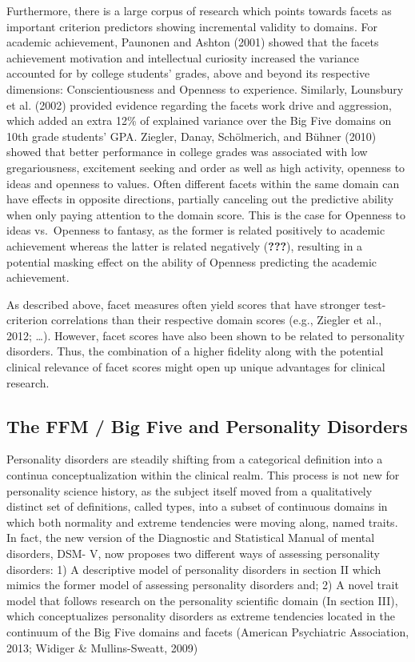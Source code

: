 \documentclass[man]{apa6}
\theoremstyle{definition}
\theoremstyle{definition}
\theoremstyle{definition}
\theoremstyle{remark}
\begin{document}
Furthermore, there is a large corpus of research which points towards
facets as important criterion predictors showing incremental validity to
domains. For academic achievement, Paunonen and Ashton (2001) showed
that the facets achievement motivation and intellectual curiosity
increased the variance accounted for by college students' grades, above
and beyond its respective dimensions: Conscientiousness and Openness to
experience. Similarly, Lounsbury et al. (2002) provided evidence
regarding the facets work drive and aggression, which added an extra
12\% of explained variance over the Big Five domains on 10th grade
students' GPA. Ziegler, Danay, Schölmerich, and Bühner (2010) showed
that better performance in college grades was associated with low
gregariousness, excitement seeking and order as well as high activity,
openness to ideas and openness to values. Often different facets within
the same domain can have effects in opposite directions, partially
canceling out the predictive ability when only paying attention to the
domain score. This is the case for Openness to ideas vs.~Openness to
fantasy, as the former is related positively to academic achievement
whereas the latter is related negatively ({\textbf{???}}), resulting in
a potential masking effect on the ability of Openness predicting the
academic achievement.

As described above, facet measures often yield scores that have stronger
test-criterion correlations than their respective domain scores (e.g.,
Ziegler et al., 2012; \ldots{}). However, facet scores have also been
shown to be related to personality disorders. Thus, the combination of a
higher fidelity along with the potential clinical relevance of facet
scores might open up unique advantages for clinical research.

\hypertarget{the-ffm-big-five-and-personality-disorders}{%
\subsection{The FFM / Big Five and Personality
Disorders}\label{the-ffm-big-five-and-personality-disorders}}

Personality disorders are steadily shifting from a categorical
definition into a continua conceptualization within the clinical realm.
This process is not new for personality science history, as the subject
itself moved from a qualitatively distinct set of definitions, called
types, into a subset of continuous domains in which both normality and
extreme tendencies were moving along, named traits. In fact, the new
version of the Diagnostic and Statistical Manual of mental disorders,
DSM- V, now proposes two different ways of assessing personality
disorders: 1) A descriptive model of personality disorders in section II
which mimics the former model of assessing personality disorders and; 2)
A novel trait model that follows research on the personality scientific
domain (In section III), which conceptualizes personality disorders as
extreme tendencies located in the continuum of the Big Five domains and
facets (American Psychiatric Association, 2013; Widiger \&
Mullins-Sweatt, 2009)
\end{document}
